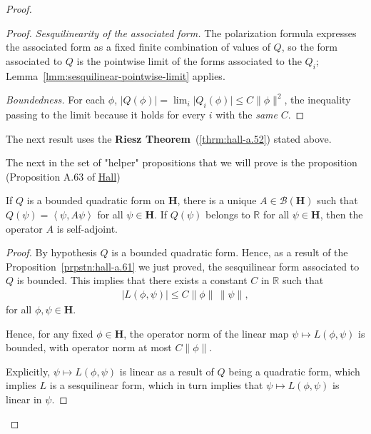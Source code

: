 \begin{proof}
\begin{proof}
\textit{Sesquilinearity of the associated form.} The polarization formula expresses the associated form as a fixed finite combination of values of $Q$, so the form associated to $Q$ is the pointwise limit of the forms associated to the $Q_i$; Lemma~\ref{lmm:sesquilinear-pointwise-limit} applies.

\textit{Boundedness.} For each $\phi$, $\lvert Q(\phi) \rvert = \lim_i \lvert Q_i(\phi) \rvert \le C \lVert \phi \rVert^2$, the inequality passing to the limit because it holds for every $i$ with the \textit{same} $C$.
\end{proof}

The next result uses the \textbf{Riesz Theorem}~(\ref{thrm:hall-a.52}) stated above.

The next in the set of "helper" propositions that we will prove is the proposition (Proposition A.63 of \href{https://doi.org/10.1007/978-1-4614-7116-5}{Hall})

\begin{proposition}
    \label{prpstn:hall-a.63}
    \leanok
    If $Q$ is a bounded quadratic form on $\mathbf{H}$, there is a unique $A \in \mathcal{B}(\mathbf{H})$ such that $Q(\psi) = \left< \psi, A\psi \right>$ for all $\psi \in \mathbf{H}$. If $Q(\psi)$ belongs to $\mathbb{R}$ for all $\psi \in \mathbf{H}$, then the operator $A$ is self-adjoint.
\end{proposition}
\begin{proof}
    \leanok
By hypothesis $Q$ is a bounded quadratic form. Hence, as a result of the Proposition~\ref{prpstn:hall-a.61} we just proved, the sesquilinear form associated to $Q$ is bounded. This implies that there exists a constant $C$ in $\mathbb{R}$ such that
\begin{align}
    \left\lvert L(\phi, \psi) \right\rvert \le C \|\phi\| \, \|\psi\|,
\end{align}
for all $\phi, \psi \in \mathbf{H}$.

Hence, for any fixed $\phi \in \mathbf{H}$, the operator norm of the linear map $\psi \mapsto L(\phi, \psi)$ is bounded, with operator norm at most $C \|\phi\|$.

Explicitly, $\psi \mapsto L(\phi, \psi)$ is linear as a result of $Q$ being a quadratic form, which implies $L$ is a sesquilinear form, which in turn implies that $\psi \mapsto L(\phi, \psi)$ is linear in $\psi$.


\end{proof}
\end{proof}
